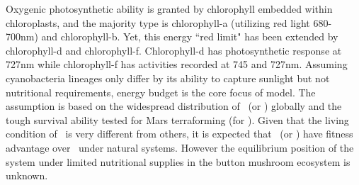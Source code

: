 \documentclass[../thesis.tex]{subfiles} %
\begin{document}
  Oxygenic photosynthetic ability is granted by chlorophyll embedded within chloroplasts, and the majority type is chlorophyll-a (utilizing red light 680-700nm) and chlorophyll-b.  Yet, this energy ``red limit" has been extended by chlorophyll-d and chlorophyll-f.  Chlorophyll-d has photosynthetic response at 727nm while chlorophyll-f has activities recorded at 745 and 727nm.
  Assuming cyanobacteria lineages only differ by its ability to capture sunlight but not nutritional requirements,\autocite{giraldo2014plant} energy budget is the core focus of model.  The assumption is based on the widespread distribution of \As\ (or \Ss) globally\autocite{joshi2018bacterial,sawa2017electricity} and the tough survival ability tested for Mars terraforming (for \Cs).\autocite{baque2013boss}  Given that the living condition of \Ct\ is very different from others,\autocite{nurnberg2018photochemistry} it is expected that \As\ (or \Ss) have fitness advantage over \Cs\ under natural systems.  However the equilibrium position of the system under limited nutritional supplies in the button mushroom ecosystem\autocite{joshi2018bacterial} is unknown.
\end{document}
